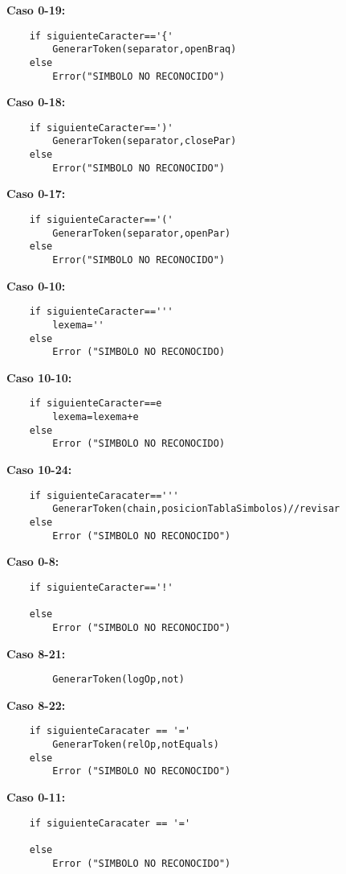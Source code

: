 \documentclass{article}
\begin{document}
\textbf{Caso 0-19:}
\begin{verbatim}
    if siguienteCaracter=='{'
        GenerarToken(separator,openBraq)
    else
        Error("SIMBOLO NO RECONOCIDO")
\end{verbatim}

\textbf{Caso 0-18:}
\begin{verbatim}
    if siguienteCaracter==')'
        GenerarToken(separator,closePar)
    else
        Error("SIMBOLO NO RECONOCIDO")  
\end{verbatim}

\textbf{Caso 0-17:}
\begin{verbatim}
    if siguienteCaracter=='('
        GenerarToken(separator,openPar)
    else
        Error("SIMBOLO NO RECONOCIDO")
\end{verbatim}

\textbf{Caso 0-10:}
\begin{verbatim}
    if siguienteCaracter=='''
        lexema=''
    else
        Error ("SIMBOLO NO RECONOCIDO)
\end{verbatim}

\textbf{Caso 10-10:}
\begin{verbatim}
    if siguienteCaracter==e
        lexema=lexema+e
    else 
        Error ("SIMBOLO NO RECONOCIDO)
\end{verbatim}

\textbf{Caso 10-24:}
\begin{verbatim}
    if siguienteCaracater=='''
        GenerarToken(chain,posicionTablaSimbolos)//revisar
    else 
        Error ("SIMBOLO NO RECONOCIDO")
\end{verbatim}

\textbf{Caso 0-8:}
\begin{verbatim}
    if siguienteCaracter=='!'
    
    else 
        Error ("SIMBOLO NO RECONOCIDO")
\end{verbatim}

\textbf{Caso 8-21:}
\begin{verbatim}
        GenerarToken(logOp,not)
\end{verbatim}

\textbf{Caso 8-22:}
\begin{verbatim}
    if siguienteCaracater == '='
        GenerarToken(relOp,notEquals)
    else 
        Error ("SIMBOLO NO RECONOCIDO")  
\end{verbatim}

\textbf{Caso 0-11:}
\begin{verbatim}
    if siguienteCaracater == '='

    else 
        Error ("SIMBOLO NO RECONOCIDO")  
\end{verbatim}
\end{document}
